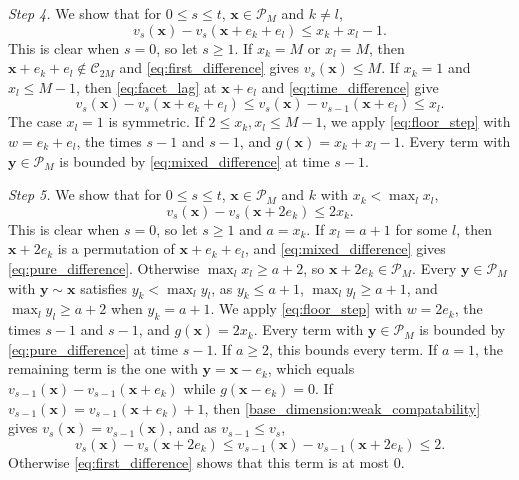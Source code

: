 \documentclass[12pt]{amsart}
\begin{document}
{\it Step 4.}
We show that for $0 \leq s \leq t$, $\mathbf{x} \in \mathcal{P}_M$ and $k \neq l$,
\begin{equation} \label{eq:mixed_difference}
v_s(\mathbf{x}) - v_s(\mathbf{x} + e_k + e_l) \leq x_k + x_l - 1.
\end{equation}
This is clear when $s = 0$, so let $s \geq 1$.
If $x_k = M$ or $x_l = M$, then $\mathbf{x} + e_k + e_l \not \in \mathcal{C}_{2M}$ and \eqref{eq:first_difference} gives $v_s(\mathbf{x}) \leq M$.
If $x_k = 1$ and $x_l \leq M-1$, then \eqref{eq:facet_lag} at $\mathbf{x} + e_l$ and \eqref{eq:time_difference} give
\[
v_s(\mathbf{x}) - v_s(\mathbf{x} + e_k + e_l) \leq v_s(\mathbf{x}) - v_{s-1}(\mathbf{x} + e_l) \leq x_l.
\]
The case $x_l = 1$ is symmetric.
If $2 \leq x_k, x_l \leq M-1$, we apply \eqref{eq:floor_step} with $w = e_k + e_l$, the times $s-1$ and $s-1$, and $g(\mathbf{x}) = x_k + x_l - 1$.
Every term with $\mathbf{y} \in \mathcal{P}_M$ is bounded by \eqref{eq:mixed_difference} at time $s-1$.

{\it Step 5.}
We show that for $0 \leq s \leq t$, $\mathbf{x} \in \mathcal{P}_M$ and $k$ with $x_k < \max_l x_l$,
\begin{equation} \label{eq:pure_difference}
v_s(\mathbf{x}) - v_s(\mathbf{x} + 2 e_k) \leq 2 x_k.
\end{equation}
This is clear when $s = 0$, so let $s \geq 1$ and $a = x_k$.
If $x_l = a + 1$ for some $l$, then $\mathbf{x} + 2 e_k$ is a permutation of $\mathbf{x} + e_k + e_l$, and \eqref{eq:mixed_difference} gives \eqref{eq:pure_difference}.
Otherwise $\max_l x_l \geq a + 2$, so $\mathbf{x} + 2 e_k \in \mathcal{P}_M$.
Every $\mathbf{y} \in \mathcal{P}_M$ with $\mathbf{y} \sim \mathbf{x}$ satisfies $y_k < \max_l y_l$, as $y_k \leq a + 1$, $\max_l y_l \geq a + 1$, and $\max_l y_l \geq a + 2$ when $y_k = a + 1$.
We apply \eqref{eq:floor_step} with $w = 2 e_k$, the times $s-1$ and $s-1$, and $g(\mathbf{x}) = 2 x_k$.
Every term with $\mathbf{y} \in \mathcal{P}_M$ is bounded by \eqref{eq:pure_difference} at time $s-1$.
If $a \geq 2$, this bounds every term.
If $a = 1$, the remaining term is the one with $\mathbf{y} = \mathbf{x} - e_k$, which equals $v_{s-1}(\mathbf{x}) - v_{s-1}(\mathbf{x} + e_k)$ while $g(\mathbf{x} - e_k) = 0$.
If $v_{s-1}(\mathbf{x}) = v_{s-1}(\mathbf{x} + e_k) + 1$, then \eqref{base_dimension:weak_compatability} gives $v_s(\mathbf{x}) = v_{s-1}(\mathbf{x})$, and as $v_{s-1} \leq v_s$,
\[
v_s(\mathbf{x}) - v_s(\mathbf{x} + 2 e_k) \leq v_{s-1}(\mathbf{x}) - v_{s-1}(\mathbf{x} + 2 e_k) \leq 2.
\]
Otherwise \eqref{eq:first_difference} shows that this term is at most $0$.
\end{document}
